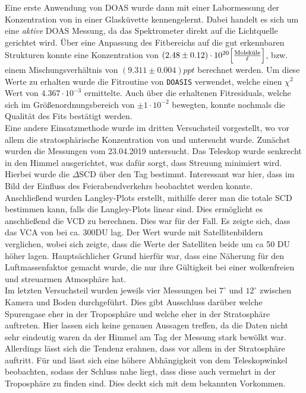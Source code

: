 \documentclass[12pt, a4paper, bibliography=totoc]{scrartcl}
\begin{document}
\begin{multicols}{2}
Eine erste Anwendung von DOAS wurde dann mit einer Labormessung der Konzentration von  in einer Glasküvette kennengelernt. 
Dabei handelt es sich um eine \textit{aktive} DOAS Messung, da das Spektrometer direkt auf die Lichtquelle gerichtet wird. 
Über eine Anpassung des Fitbereichs auf die gut erkennbaren  Strukturen konnte eine Konzentration von $(2.48 \pm 0.12) \cdot 10^{20} \Bigl[ \frac{\text{Moleküle}}{\ell}\Bigr]$, bzw. einem Mischungsverhältnis von $(9.311 \pm 0.004) \si{ppt}$ berechnet werden. 
Um diese Werte zu erhalten wurde die Fitroutine von \verb*+DOASIS+ verwendet, welche einen $\chi^2$ Wert von $4.367 \cdot 10^{-3}$ ermittelte. Auch über die erhaltenen Fitresiduals, welche sich im Größenordnungsbereich von $\pm 1 \cdot 10^{-2}$ bewegten, konnte nochmals die Qualität des Fits bestätigt werden.\\

Eine andere Einsatzmethode wurde im dritten Versuchsteil vorgestellt, wo vor allem die stratosphärische Konzentration von  und  untersucht wurde.
Zunächst wurden die Messungen vom 23.04.2019 untersucht.
Das Teleskop wurde senkrecht in den Himmel ausgerichtet, was dafür sorgt, dass Streuung minimiert wird.
Hierbei wurde die $\Delta$SCD über den Tag bestimmt.
Interessant war hier, dass im  Bild der Einfluss des Feierabendverkehrs beobachtet werden konnte.\\
Anschließend wurden Langley-Plots erstellt, mithilfe derer man die totale SCD bestimmen kann, falls die Langley-Plots linear sind. Dies ermöglicht es anschließend die VCD zu berechnen.
Dies war für  der Fall.
Es zeigte sich, dass das VCA von  bei ca. 300\si{DU} lag.
Der Wert wurde mit Satellitenbildern verglichen, wobei sich zeigte, dass die Werte der Satelliten beide um ca 50 \si{DU} höher lagen.
Hauptsächlicher Grund hierfür war, dass eine Näherung für den Luftmassenfaktor gemacht wurde, die nur ihre Gültigkeit bei einer wolkenfreien und streuarmen Atmosphäre hat.\\

Im letzten Versuchsteil wurden jeweils vier Messungen bei $7^\circ$ und $12^\circ$ zwischen Kamera und Boden durchgeführt.
Dies gibt Ausschluss darüber welche Spurengase eher in der Troposphäre und welche eher in der Stratosphäre auftreten.
Hier lassen sich keine genauen Aussagen treffen, da die Daten nicht sehr eindeutig waren da der Himmel am Tag der Messung stark bewölkt war.
Allerdings lässt sich die Tendenz erahnen, dass  vor allem in der Stratosphäre auftritt. Für  und  lässt sich eine höhere Abhängigkeit von dem Teleskopwinkel beobachten, sodass der Schluss nahe liegt, dass diese auch vermehrt in der Troposphäre zu finden sind. Dies deckt sich mit dem bekannten Vorkommen.


\nocite{*}
\appendix
\end{multicols}
\newpage
\end{document}
